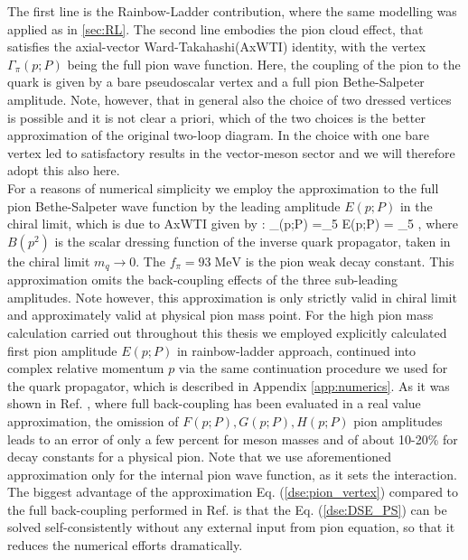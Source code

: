 The first line is the Rainbow-Ladder contribution, where the same modelling was applied as in \ref{sec:RL}. The second line embodies the pion cloud effect, that satisfies the axial-vector Ward-Takahashi(AxWTI) identity, with the vertex $\Gamma_\pi (p;P)$ being the full pion wave function. Here, the coupling of the pion to the quark is given by a bare pseudoscalar vertex and a full pion Bethe-Salpeter amplitude. Note, however, that in general also the choice of two dressed vertices is possible and it is not clear a priori, which of the two choices is the better approximation of the original two-loop diagram. In \cite{Fischer:2008wy} the choice with one bare vertex led to satisfactory results in the vector-meson sector and we will therefore adopt this also here. \\

For a reasons of numerical simplicity we employ the approximation to the full pion Bethe-Salpeter wave function by the
leading amplitude $E(p;P)$ in the chiral limit, which is due to AxWTI given by \cite{Maris:1997hd}:
\beqa
	\Gamma_\pi(p;P) =\gamma_5 E(p;P) = \gamma_5 \;,
	\label{dse:pion_vertex}
\eeqa
where $B(p^2)$ is the scalar dressing function of the inverse quark propagator, taken in the chiral limit $m_q \rightarrow 0$. The $f_\pi = 93 \; \text{MeV}$ is the pion weak decay constant. This approximation omits the back-coupling effects of the three sub-leading amplitudes. Note however, this approximation is only strictly valid in chiral limit and approximately valid at physical pion mass point. For the high pion mass calculation carried out throughout this thesis we employed explicitly calculated first pion amplitude $E(p;P)$ in rainbow-ladder approach, continued into complex relative momentum $p$ via the same continuation procedure we used for the quark propagator, which is described in Appendix \ref{app:numerics}. As it was shown in Ref. \cite{Fischer:2008sp}, where full back-coupling has been evaluated in a real value approximation, the omission of $F(p;P), G(p;P), H(p;P)$ pion amplitudes leads to an error of only a few percent for meson masses and of about 10-20\% for decay constants for a physical pion. Note that we use aforementioned approximation only for the internal pion wave function, as it sets the interaction. The biggest advantage of the approximation Eq. (\ref{dse:pion_vertex}) compared to the full back-coupling performed in Ref. \cite{Fischer:2008sp} is that the Eq. (\ref{dse:DSE_PS}) can be solved self-consistently without any external input from pion \BS equation, so that it reduces the numerical efforts dramatically. \\

